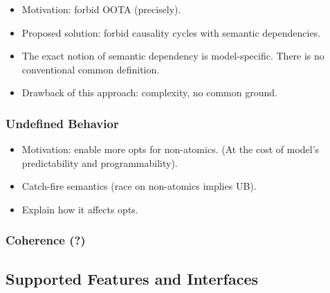 \begin{itemize}
  \item Motivation: forbid OOTA (precisely).
  \item Proposed solution: forbid causality cycles with semantic dependencies. 
  \item The exact notion of semantic dependency is model-specific.
        There is no conventional common definition.
  \item Drawback of this approach: complexity, no common ground.
\end{itemize}

\subsubsection{Undefined Behavior}
\label{sec:bgrnd-ub}

\begin{itemize}
  \item Motivation: enable more opts for non-atomics.
        (At the cost of model's predictability and programmability).
  \item Catch-fire semantics (race on non-atomics implies UB).
  \item Explain how it affects opts.
\end{itemize}

\subsubsection{Coherence (?)}

\subsection{Supported Features and Interfaces}

